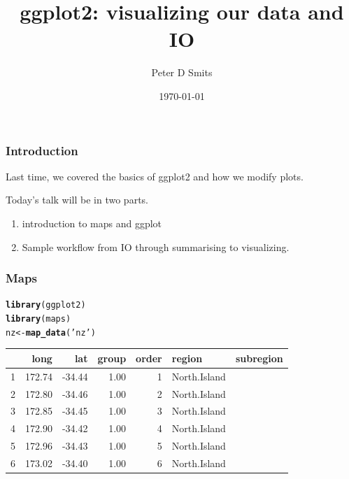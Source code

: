 \documentclass{beamer}\usepackage{graphicx, color}
\title{ggplot2: visualizing our data and IO}
\author{Peter D Smits}
\institute{Committee on Evolutionary Biology \\
University of Chicago}
\date{\today}
\makeatletter
\newcommand{\hlfunctioncall}[1]{\textcolor[rgb]{0.501960784313725,0,0.329411764705882}{\textbf{#1}}}%
\newcommand{\hlstring}[1]{\textcolor[rgb]{0.6,0.6,1}{#1}}%
\newenvironment{kframe}{%
 \def\at@end@of@kframe{}%
 \ifinner\ifhmode%
  \def\at@end@of@kframe{\end{minipage}}%
  \begin{minipage}{\columnwidth}%
 \fi\fi%
 \def\FrameCommand##1{\hskip\@totalleftmargin \hskip-\fboxsep
 \colorbox{shadecolor}{##1}\hskip-\fboxsep
     \hskip-\linewidth \hskip-\@totalleftmargin \hskip\columnwidth}%
 \MakeFramed {\advance\hsize-\width
   \@totalleftmargin\z@ \linewidth\hsize
   \@setminipage}}%
 {\par\unskip\endMakeFramed%
 \at@end@of@kframe}
\newenvironment{knitrout}{}{} %
\makeatother
\begin{document}
\begin{frame}
  \maketitle
\end{frame}

\begin{frame}
  \frametitle{Introduction}

  Last time, we covered the basics of ggplot2 and how we modify plots.

  Today's talk will be in two parts. 
  \begin{enumerate}
    \item introduction to maps and ggplot
    \item Sample workflow from IO through summarising to visualizing.
  \end{enumerate}

\end{frame}

\begin{frame}[fragile]
  \frametitle{Maps}
\begin{knitrout}\scriptsize
{}\color{fgcolor}\begin{kframe}
\begin{alltt}
\hlfunctioncall{library}(ggplot2)
\hlfunctioncall{library}(maps)
nz <- \hlfunctioncall{map_data}(\hlstring{'nz'})
\end{alltt}
\end{kframe}
\end{knitrout}


\begin{table}[ht]
\begin{center}
\begin{tabular}{rrrrrll}
  \hline
 & long & lat & group & order & region & subregion \\ 
  \hline
1 & 172.74 & -34.44 & 1.00 &   1 & North.Island  &  \\ 
  2 & 172.80 & -34.46 & 1.00 &   2 & North.Island  &  \\ 
  3 & 172.85 & -34.45 & 1.00 &   3 & North.Island  &  \\ 
  4 & 172.90 & -34.42 & 1.00 &   4 & North.Island  &  \\ 
  5 & 172.96 & -34.43 & 1.00 &   5 & North.Island  &  \\ 
  6 & 173.02 & -34.40 & 1.00 &   6 & North.Island  &  \\ 
   \hline
\end{tabular}
\end{center}
\end{table}



\end{frame}
\end{document}
